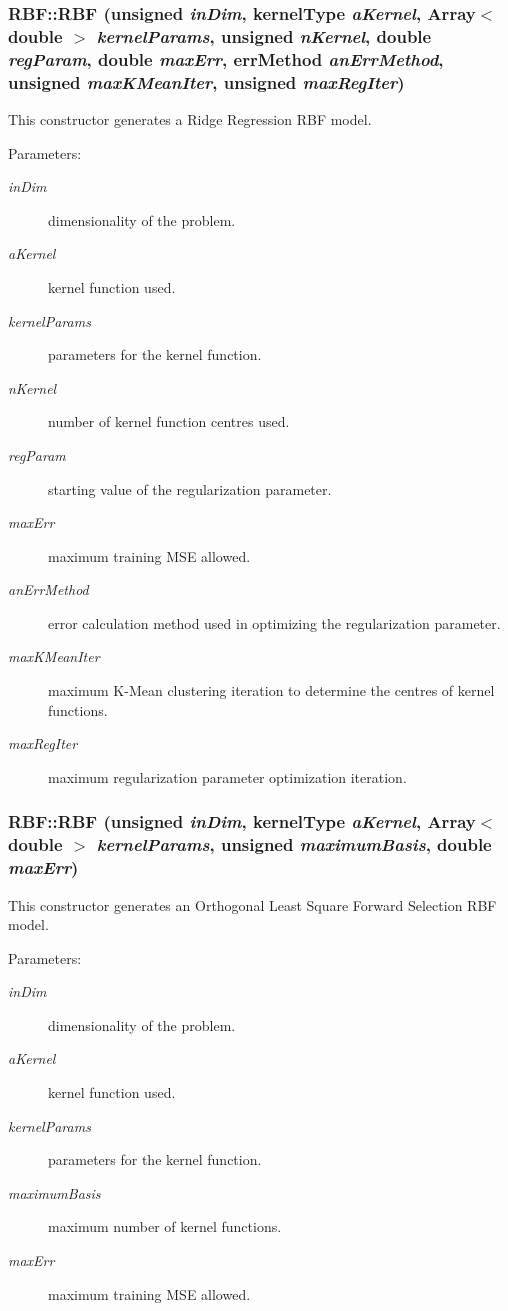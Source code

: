 \subsubsection{\setlength{\rightskip}{0pt plus 5cm}RBF::RBF (unsigned {\em in\-Dim}, kernel\-Type {\em a\-Kernel}, Array$<$ double $>$ {\em kernel\-Params}, unsigned {\em n\-Kernel}, double {\em reg\-Param}, double {\em max\-Err}, err\-Method {\em an\-Err\-Method}, unsigned {\em max\-KMean\-Iter}, unsigned {\em max\-Reg\-Iter})}\label{classRBF_a2}


This constructor generates a Ridge Regression RBF model. 

\begin{Desc}
\item[Parameters:]
\begin{description}
\item[{\em in\-Dim}]dimensionality of the problem. \item[{\em a\-Kernel}]kernel function used. \item[{\em kernel\-Params}]parameters for the kernel function. \item[{\em n\-Kernel}]number of kernel function centres used. \item[{\em reg\-Param}]starting value of the regularization parameter. \item[{\em max\-Err}]maximum training MSE allowed. \item[{\em an\-Err\-Method}]error calculation method used in optimizing the regularization parameter. \item[{\em max\-KMean\-Iter}]maximum K-Mean clustering iteration to determine the centres of kernel functions. \item[{\em max\-Reg\-Iter}]maximum regularization parameter optimization iteration.\end{description}
\end{Desc}
\subsubsection{\setlength{\rightskip}{0pt plus 5cm}RBF::RBF (unsigned {\em in\-Dim}, kernel\-Type {\em a\-Kernel}, Array$<$ double $>$ {\em kernel\-Params}, unsigned {\em maximum\-Basis}, double {\em max\-Err})}\label{classRBF_a3}


This constructor generates an Orthogonal Least Square Forward Selection RBF model. 

\begin{Desc}
\item[Parameters:]
\begin{description}
\item[{\em in\-Dim}]dimensionality of the problem. \item[{\em a\-Kernel}]kernel function used. \item[{\em kernel\-Params}]parameters for the kernel function. \item[{\em maximum\-Basis}]maximum number of kernel functions. \item[{\em max\-Err}]maximum training MSE allowed.\end{description}
\end{Desc}


